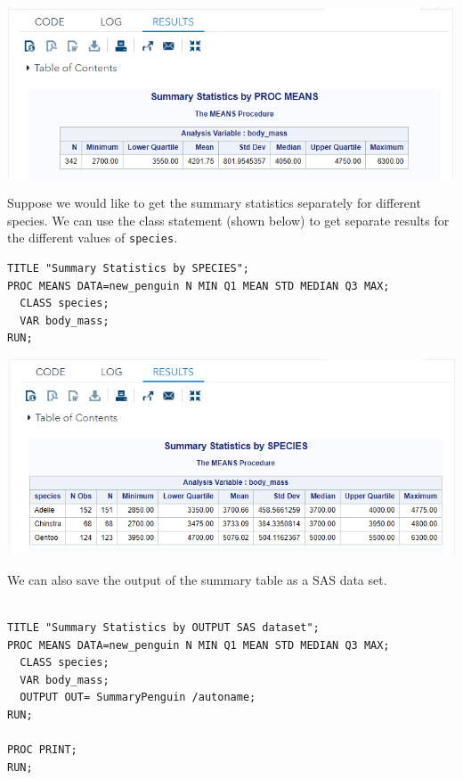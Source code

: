 \documentclass[
]{book}
\begin{document}
\begin{center}\includegraphics[width=1\linewidth]{img05/w05-ProcMeansTables} \end{center}

Suppose we would like to get the summary statistics separately for different species. We can use the class statement (shown below) to get separate results for the different values of \texttt{species}.

\begin{verbatim}
TITLE "Summary Statistics by SPECIES";
PROC MEANS DATA=new_penguin N MIN Q1 MEAN STD MEDIAN Q3 MAX;
  CLASS species;
  VAR body_mass;
RUN;
\end{verbatim}

\begin{center}\includegraphics[width=1\linewidth]{img05/w05-ProcMeansTablesBySpecies} \end{center}

We can also save the output of the summary table as a SAS data set.

\begin{verbatim}
  
TITLE "Summary Statistics by OUTPUT SAS dataset";
PROC MEANS DATA=new_penguin N MIN Q1 MEAN STD MEDIAN Q3 MAX;
  CLASS species;
  VAR body_mass;
  OUTPUT OUT= SummaryPenguin /autoname;
RUN; 
  
PROC PRINT;
RUN;
\end{verbatim}
\end{document}
